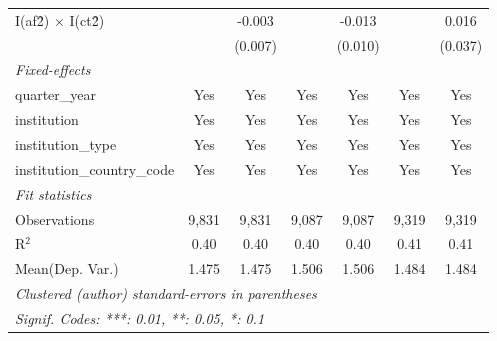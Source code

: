 \begin{tabular}{lcccccc}
   I(af\^2) $\times$ I(ct\^2)         &               & -0.003         &               & -0.013         &               & 0.016\\   
                                      &               & (0.007)        &               & (0.010)        &               & (0.037)\\   
   \midrule
   \emph{Fixed-effects}\\
   quarter\_year                      & Yes           & Yes            & Yes           & Yes            & Yes           & Yes\\  
   institution                        & Yes           & Yes            & Yes           & Yes            & Yes           & Yes\\  
   institution\_type                  & Yes           & Yes            & Yes           & Yes            & Yes           & Yes\\  
   institution\_country\_code         & Yes           & Yes            & Yes           & Yes            & Yes           & Yes\\  
   \midrule
   \emph{Fit statistics}\\
   Observations                       & 9,831         & 9,831          & 9,087         & 9,087          & 9,319         & 9,319\\  
   R$^2$                              & 0.40          & 0.40           & 0.40          & 0.40           & 0.41          & 0.41\\  
Mean(Dep. Var.) & 1.475 & 1.475 & 1.506 & 1.506 & 1.484 & 1.484 \\
   \midrule \midrule
   \multicolumn{7}{l}{\emph{Clustered (author) standard-errors in parentheses}}\\
   \multicolumn{7}{l}{\emph{Signif. Codes: ***: 0.01, **: 0.05, *: 0.1}}\\
\end{tabular}
\par\endgroup
